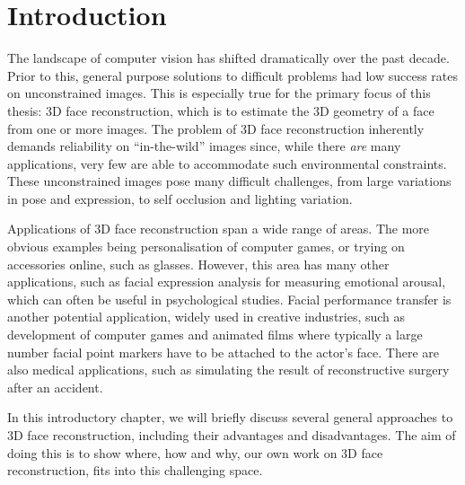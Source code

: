 \chapter{Introduction}

The landscape of computer vision has shifted dramatically over the
past decade. Prior to this, general purpose solutions to difficult
problems had low success rates on unconstrained images. This is
especially true for the primary focus of this thesis: 3D face
reconstruction, which is to estimate the 3D geometry of a face from
one or more images. The problem of 3D face reconstruction inherently
demands reliability on ``in-the-wild'' images since, while there
\textit{are} many applications, very few are able to accommodate such
environmental constraints. These unconstrained images pose many
difficult challenges, from large variations in pose and expression, to
self occlusion and lighting variation.

Applications of 3D face reconstruction span a wide range of areas. The
more obvious examples being personalisation of computer games, or
trying on accessories online, such as glasses. However, this area has
many other applications, such as facial expression analysis for
measuring emotional arousal, which can often be useful in
psychological studies. Facial performance transfer is another
potential application, widely used in creative industries, such as
development of computer games and animated films where typically a
large number facial point markers have to be attached to the actor's
face. There are also medical applications, such as simulating the
result of reconstructive surgery after an accident.

In this introductory chapter, we will briefly discuss several general
approaches to 3D face reconstruction, including their advantages and
disadvantages. The aim of doing this is to show where, how and why,
our own work on 3D face reconstruction, fits into this challenging space.


